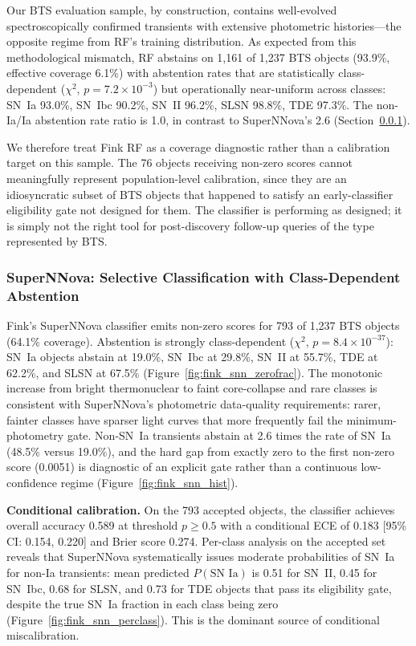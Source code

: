 \documentclass[twocolumn]{aastex631}
\begin{document}
Our BTS evaluation sample, by construction, contains well-evolved spectroscopically confirmed transients with extensive photometric histories---the opposite regime from RF's training distribution. As expected from this methodological mismatch, RF abstains on 1,161 of 1,237 BTS objects (93.9\%, effective coverage 6.1\%) with abstention rates that are statistically class-dependent ($\chi^2$, $p = 7.2 \times 10^{-3}$) but operationally near-uniform across classes: SN~Ia 93.0\%, SN~Ibc 90.2\%, SN~II 96.2\%, SLSN 98.8\%, TDE 97.3\%. The non-Ia/Ia abstention rate ratio is 1.0, in contrast to SuperNNova's 2.6 (Section~\ref{sec:fink_snn}).

We therefore treat Fink RF as a coverage diagnostic rather than a calibration target on this sample. The 76 objects receiving non-zero scores cannot meaningfully represent population-level calibration, since they are an idiosyncratic subset of BTS objects that happened to satisfy an early-classifier eligibility gate not designed for them. The classifier is performing as designed; it is simply not the right tool for post-discovery follow-up queries of the type represented by BTS.

\subsubsection{SuperNNova: Selective Classification with Class-Dependent Abstention} \label{sec:fink_snn}

Fink's SuperNNova classifier \citep{moller2020} emits non-zero scores for 793 of 1,237 BTS objects (64.1\% coverage). Abstention is strongly class-dependent ($\chi^2$, $p = 8.4 \times 10^{-37}$): SN~Ia objects abstain at 19.0\%, SN~Ibc at 29.8\%, SN~II at 55.7\%, TDE at 62.2\%, and SLSN at 67.5\% (Figure~\ref{fig:fink_snn_zerofrac}). The monotonic increase from bright thermonuclear to faint core-collapse and rare classes is consistent with SuperNNova's photometric data-quality requirements: rarer, fainter classes have sparser light curves that more frequently fail the minimum-photometry gate. Non-SN~Ia transients abstain at 2.6 times the rate of SN~Ia (48.5\% versus 19.0\%), and the hard gap from exactly zero to the first non-zero score (0.0051) is diagnostic of an explicit gate rather than a continuous low-confidence regime (Figure~\ref{fig:fink_snn_hist}).

\textbf{Conditional calibration.} On the 793 accepted objects, the classifier achieves overall accuracy 0.589 at threshold $p \ge 0.5$ with a conditional ECE of 0.183 [95\% CI: 0.154, 0.220] and Brier score 0.274. Per-class analysis on the accepted set reveals that SuperNNova systematically issues moderate probabilities of SN~Ia for non-Ia transients: mean predicted $P(\text{SN~Ia})$ is 0.51 for SN~II, 0.45 for SN~Ibc, 0.68 for SLSN, and 0.73 for TDE objects that pass its eligibility gate, despite the true SN~Ia fraction in each class being zero (Figure~\ref{fig:fink_snn_perclass}). This is the dominant source of conditional miscalibration.
\end{document}
